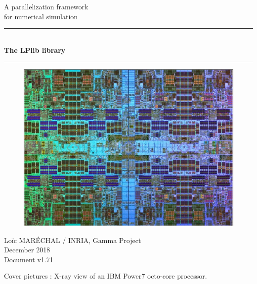 \documentclass[a4paper,12pt]{article}
\newcommand{\HRule}{\rule{\linewidth}{1mm}}
\begin{document}
%
%

\begin{titlepage}

\begin{center}
\huge A parallelization framework\\ for numerical simulation
\HRule \\
\medskip
{\Huge \bfseries The LPlib library} \\
\HRule
\end{center}


\begin{figure}[htbp]
\begin{center}
\includegraphics[width=12cm]{power7.pdf}
\end{center}
\end{figure}


\begin{flushright}
\Large Lo\"ic MAR\'ECHAL / INRIA, Gamma Project\\
\Large December 2018 \\
\normalsize Document v1.71
\end{flushright}

\end{titlepage}

\clearpage

\setcounter{tocdepth}{2}
\tableofcontents
\vfill

\footnotesize{Cover pictures : X-ray view of an IBM Power7 octo-core processor.}
\normalsize
\end{document}
